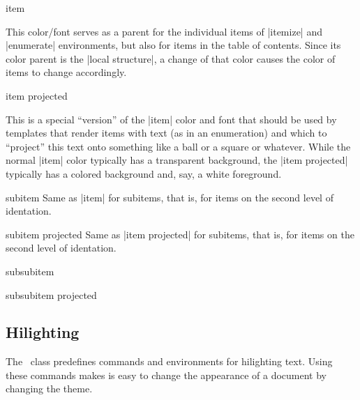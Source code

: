 \begin{element}{item}\no\yes\yes

  This color/font serves as a parent for the individual items of
  |itemize| and |enumerate| environments, but also for items in the
  table of contents. Since its color parent is the |local structure|,
  a change of that color causes the color of items to change
  accordingly.
\end{element}

\begin{element}{item projected}\no\yes\yes

  This is a special ``version'' of the |item| color and font that
  should be used by templates that render items with text (as in an
  enumeration) and which to ``project'' this text onto something like
  a ball or a square or whatever. While the normal |item| color
  typically has a transparent background, the |item projected|
  typically has a colored background and, say, a white foreground. 
\end{element}

\begin{element}{subitem}\no\yes\yes
  Same as |item| for subitems, that is, for items on the second level of
  identation. 
\end{element}

\begin{element}{subitem projected}\no\yes\yes
  Same as |item projected| for subitems, that is, for items on the
  second level of identation. 
\end{element}

\begin{element}{subsubitem}\no\yes\yes
\end{element}

\begin{element}{subsubitem projected}\no\yes\yes
\end{element}




\subsection{Hilighting}

The \beamer\ class predefines commands and environments for
hilighting text. Using these commands makes is easy to change the
appearance of a document by changing the theme. 


